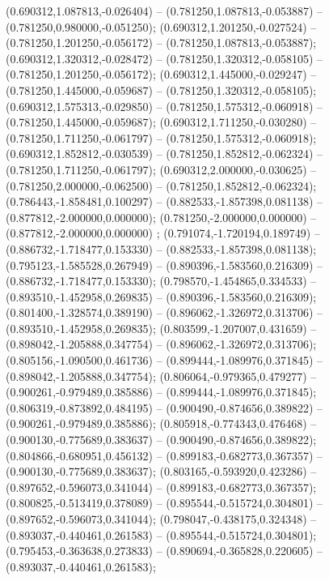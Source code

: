  (0.690312,1.087813,-0.026404) -- (0.781250,1.087813,-0.053887) -- (0.781250,0.980000,-0.051250);
 (0.690312,1.201250,-0.027524) -- (0.781250,1.201250,-0.056172) -- (0.781250,1.087813,-0.053887);
 (0.690312,1.320312,-0.028472) -- (0.781250,1.320312,-0.058105) -- (0.781250,1.201250,-0.056172);
 (0.690312,1.445000,-0.029247) -- (0.781250,1.445000,-0.059687) -- (0.781250,1.320312,-0.058105);
 (0.690312,1.575313,-0.029850) -- (0.781250,1.575312,-0.060918) -- (0.781250,1.445000,-0.059687);
 (0.690312,1.711250,-0.030280) -- (0.781250,1.711250,-0.061797) -- (0.781250,1.575312,-0.060918);
 (0.690312,1.852812,-0.030539) -- (0.781250,1.852812,-0.062324) -- (0.781250,1.711250,-0.061797);
 (0.690312,2.000000,-0.030625) -- (0.781250,2.000000,-0.062500) -- (0.781250,1.852812,-0.062324);
 (0.786443,-1.858481,0.100297) -- (0.882533,-1.857398,0.081138) -- (0.877812,-2.000000,0.000000);
 (0.781250,-2.000000,0.000000) -- (0.877812,-2.000000,0.000000) ;
 (0.791074,-1.720194,0.189749) -- (0.886732,-1.718477,0.153330) -- (0.882533,-1.857398,0.081138);
 (0.795123,-1.585528,0.267949) -- (0.890396,-1.583560,0.216309) -- (0.886732,-1.718477,0.153330);
 (0.798570,-1.454865,0.334533) -- (0.893510,-1.452958,0.269835) -- (0.890396,-1.583560,0.216309);
 (0.801400,-1.328574,0.389190) -- (0.896062,-1.326972,0.313706) -- (0.893510,-1.452958,0.269835);
 (0.803599,-1.207007,0.431659) -- (0.898042,-1.205888,0.347754) -- (0.896062,-1.326972,0.313706);
 (0.805156,-1.090500,0.461736) -- (0.899444,-1.089976,0.371845) -- (0.898042,-1.205888,0.347754);
 (0.806064,-0.979365,0.479277) -- (0.900261,-0.979489,0.385886) -- (0.899444,-1.089976,0.371845);
 (0.806319,-0.873892,0.484195) -- (0.900490,-0.874656,0.389822) -- (0.900261,-0.979489,0.385886);
 (0.805918,-0.774343,0.476468) -- (0.900130,-0.775689,0.383637) -- (0.900490,-0.874656,0.389822);
 (0.804866,-0.680951,0.456132) -- (0.899183,-0.682773,0.367357) -- (0.900130,-0.775689,0.383637);
 (0.803165,-0.593920,0.423286) -- (0.897652,-0.596073,0.341044) -- (0.899183,-0.682773,0.367357);
 (0.800825,-0.513419,0.378089) -- (0.895544,-0.515724,0.304801) -- (0.897652,-0.596073,0.341044);
 (0.798047,-0.438175,0.324348) -- (0.893037,-0.440461,0.261583) -- (0.895544,-0.515724,0.304801);
 (0.795453,-0.363638,0.273833) -- (0.890694,-0.365828,0.220605) -- (0.893037,-0.440461,0.261583);
